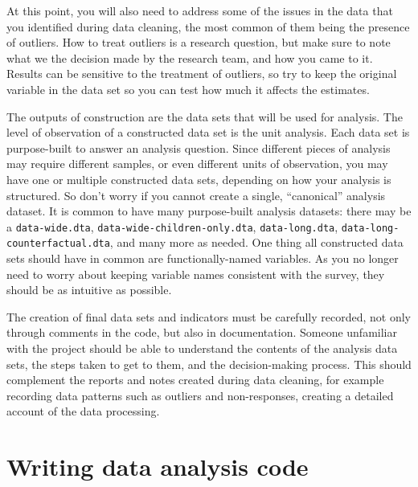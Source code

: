 At this point, you will also need to address some of the issues in the data
that you identified during data cleaning,
the most common of them being the presence of outliers.
How to treat outliers is a research question, 
but make sure to note what we the decision made by the research team,
and how you came to it. 
Results can be sensitive to the treatment of outliers,
so try to keep the original variable in the data set 
so you can test how much it affects the estimates.


The outputs of construction are the data sets that will be used for analysis.
The level of observation of a constructed data set is the unit analysis. 
Each data set is purpose-built to answer an analysis question.
Since different pieces of analysis may require different samples,
or even different units of observation,
you may have one or multiple constructed data sets, 
depending on how your analysis is structured.
So don't worry if you cannot create a single, ``canonical'' analysis dataset.
It is common to have many purpose-built analysis datasets:
there may be a \texttt{data-wide.dta},
\texttt{data-wide-children-only.dta}, \texttt{data-long.dta},
\texttt{data-long-counterfactual.dta}, and many more as needed.
One thing all constructed data sets should have in common are functionally-named variables.
As you no longer need to worry about keeping variable names
consistent with the survey, they should be as intuitive as possible.

The creation of final data sets and indicators must be carefully recorded,
not only through comments in the code, but also in documentation.
Someone unfamiliar with the project should be able to understand
the contents of the analysis data sets,
the steps taken to get to them,
and the decision-making process.
This should complement the reports and notes 
created during data cleaning, 
for example recording data patterns such as
outliers and non-responses, 
creating a detailed account of the data processing.




\section{Writing data analysis code}

